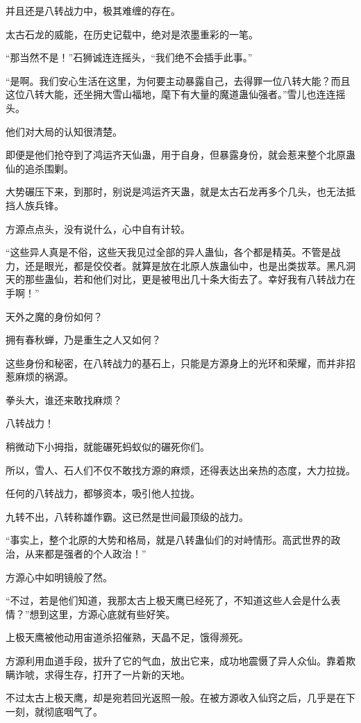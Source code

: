 \begin{this_body}
并且还是八转战力中，极其难缠的存在。

太古石龙的威能，在历史记载中，绝对是浓墨重彩的一笔。

“那当然不是！”石狮诚连连摇头，“我们绝不会插手此事。”

“是啊。我们安心生活在这里，为何要主动暴露自己，去得罪一位八转大能？而且这位八转大能，还坐拥大雪山福地，麾下有大量的魔道蛊仙强者。”雪儿也连连摇头。

他们对大局的认知很清楚。

即便是他们抢夺到了鸿运齐天仙蛊，用于自身，但暴露身份，就会惹来整个北原蛊仙的追杀围剿。

大势碾压下来，到那时，别说是鸿运齐天蛊，就是太古石龙再多个几头，也无法抵挡人族兵锋。

方源点点头，没有说什么，心中自有计较。

“这些异人真是不俗，这些天我见过全部的异人蛊仙，各个都是精英。不管是战力，还是眼光，都是佼佼者。就算是放在北原人族蛊仙中，也是出类拔萃。黑凡洞天的那些蛊仙，若和他们对比，更是被甩出几十条大街去了。幸好我有八转战力在手啊！”

天外之魔的身份如何？

拥有春秋蝉，乃是重生之人又如何？

这些身份和秘密，在八转战力的基石上，只能是方源身上的光环和荣耀，而并非招惹麻烦的祸源。

拳头大，谁还来敢找麻烦？

八转战力！

稍微动下小拇指，就能碾死蚂蚁似的碾死你们。

所以，雪人、石人们不仅不敢找方源的麻烦，还得表达出亲热的态度，大力拉拢。

任何的八转战力，都够资本，吸引他人拉拢。

九转不出，八转称雄作霸。这已然是世间最顶级的战力。

“事实上，整个北原的大势和格局，就是八转蛊仙们的对峙情形。高武世界的政治，从来都是强者的个人政治！”

方源心中如明镜般了然。

“不过，若是他们知道，我那太古上极天鹰已经死了，不知道这些人会是什么表情？”想到这里，方源心底就有些好笑。

上极天鹰被他动用宙道杀招催熟，天晶不足，饿得濒死。

方源利用血道手段，拔升了它的气血，放出它来，成功地震慑了异人众仙。靠着欺瞒诈唬，求得生存，打开了一片新的天地。

不过太古上极天鹰，却是宛若回光返照一般。在被方源收入仙窍之后，几乎是在下一刻，就彻底咽气了。


\end{this_body}

